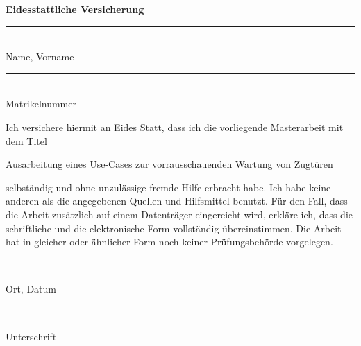 








\begin{center}
	\textbf{Eidesstattliche Versicherung}
\end{center}
\vspace{2cm}

\parbox{7cm}{\rule{7cm}{1pt}\\Name, Vorname}
\hfill 
\parbox{7cm}{\rule{7cm}{1pt}\\Matrikelnummer}
\vspace{1cm}

Ich versichere hiermit an Eides Statt, dass ich die vorliegende Masterarbeit mit dem Titel

\glqq Ausarbeitung eines Use-Cases zur vorrausschauenden Wartung von Zugtüren\grqq

selbständig und ohne unzulässige fremde Hilfe erbracht habe. Ich habe keine anderen als
die angegebenen Quellen und Hilfsmittel benutzt. Für den Fall, dass die Arbeit zusätzlich auf
einem Datenträger eingereicht wird, erkläre ich, dass die schriftliche und die elektronische
Form vollständig übereinstimmen. Die Arbeit hat in gleicher oder ähnlicher Form noch keiner
Prüfungsbehörde vorgelegen.

\vspace{2cm}
\parbox{7cm}{\rule{7cm}{1pt}\\Ort, Datum}
\hfill 
\parbox{7cm}{\rule{7cm}{1pt}\\Unterschrift}
\clearpage